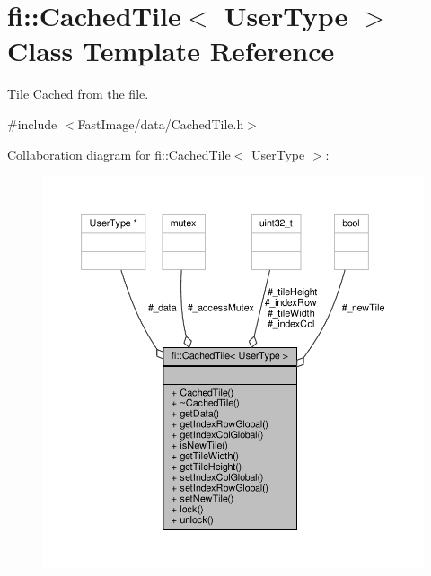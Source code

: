 \hypertarget{classfi_1_1CachedTile}{}\section{fi\+:\+:Cached\+Tile$<$ User\+Type $>$ Class Template Reference}
\label{classfi_1_1CachedTile}


Tile Cached from the file.  




{\ttfamily \#include $<$Fast\+Image/data/\+Cached\+Tile.\+h$>$}



Collaboration diagram for fi\+:\+:Cached\+Tile$<$ User\+Type $>$\+:
\nopagebreak
\begin{figure}[H]
\begin{center}
\leavevmode
\includegraphics[width=350pt]{d5/da1/classfi_1_1CachedTile__coll__graph}
\end{center}
\end{figure}
